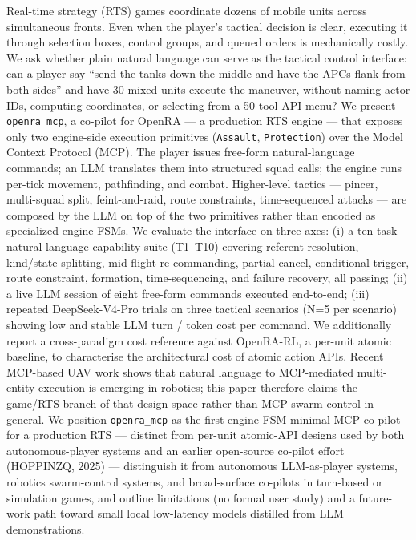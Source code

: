 \documentclass[
  journal]{IEEEtran}
\begin{document}
Real-time strategy (RTS) games coordinate dozens of mobile units across
simultaneous fronts. Even when the player's tactical decision is clear,
executing it through selection boxes, control groups, and queued orders
is mechanically costly. We ask whether plain natural language can serve
as the tactical control interface: can a player say ``send the tanks
down the middle and have the APCs flank from both sides'' and have 30
mixed units execute the maneuver, without naming actor IDs, computing
coordinates, or selecting from a 50-tool API menu? We present
\texttt{openra\_mcp}, a co-pilot for OpenRA --- a production RTS engine
--- that exposes only two engine-side execution primitives
(\texttt{Assault}, \texttt{Protection}) over the Model Context Protocol
(MCP). The player issues free-form natural-language commands; an LLM
translates them into structured squad calls; the engine runs per-tick
movement, pathfinding, and combat. Higher-level tactics --- pincer,
multi-squad split, feint-and-raid, route constraints, time-sequenced
attacks --- are composed by the LLM on top of the two primitives rather
than encoded as specialized engine FSMs. We evaluate the interface on
three axes: (i) a ten-task natural-language capability suite (T1--T10)
covering referent resolution, kind/state splitting, mid-flight
re-commanding, partial cancel, conditional trigger, route constraint,
formation, time-sequencing, and failure recovery, all passing; (ii) a
live LLM session of eight free-form commands executed end-to-end; (iii)
repeated DeepSeek-V4-Pro trials on three tactical scenarios (N=5 per
scenario) showing low and stable LLM turn / token cost per command. We
additionally report a cross-paradigm cost reference against OpenRA-RL, a
per-unit atomic baseline, to characterise the architectural cost of
atomic action APIs. Recent MCP-based UAV work shows that natural
language to MCP-mediated multi-entity execution is emerging in robotics;
this paper therefore claims the game/RTS branch of that design space
rather than MCP swarm control in general. We position
\texttt{openra\_mcp} as the first engine-FSM-minimal MCP co-pilot for a
production RTS --- distinct from per-unit atomic-API designs used by
both autonomous-player systems and an earlier open-source co-pilot
effort (HOPPINZQ, 2025) --- distinguish it from autonomous LLM-as-player
systems, robotics swarm-control systems, and broad-surface co-pilots in
turn-based or simulation games, and outline limitations (no formal user
study) and a future-work path toward small local low-latency models
distilled from LLM demonstrations.
\end{document}
